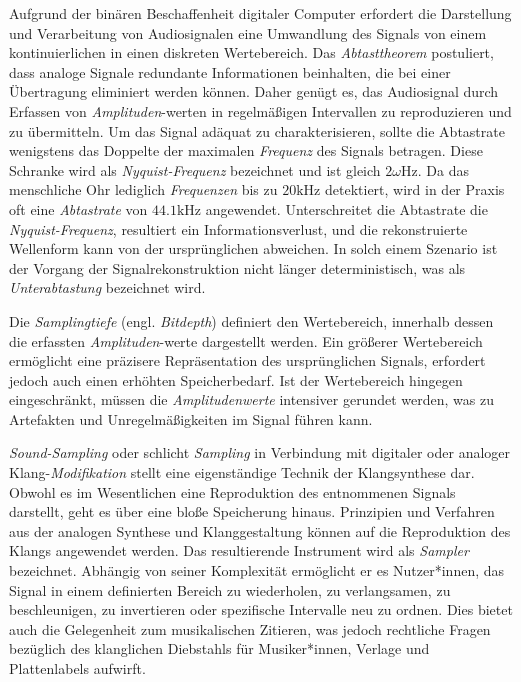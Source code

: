 \documentclass[
  a4paper,  %
  twoside,  %
  bibliography=totoc,
  headsepline,
  cleardoublepage=empty,
  parskip=half,
  draft=false
]{scrbook}
\begin{document}
Aufgrund der binären Beschaffenheit digitaler Computer erfordert die Darstellung und Verarbeitung von Audiosignalen eine Umwandlung des Signals von einem kontinuierlichen in einen diskreten Wertebereich. Das \emph{Abtasttheorem} postuliert, dass analoge Signale redundante Informationen beinhalten, die bei einer Übertragung eliminiert werden können. Daher genügt es, das Audiosignal durch Erfassen von \emph{Amplituden}-werten in regelmäßigen Intervallen zu reproduzieren und zu übermitteln. Um das Signal adäquat zu charakterisieren, sollte die Abtastrate wenigstens das Doppelte der maximalen \emph{Frequenz} des Signals betragen. Diese Schranke wird als \emph{Nyquist-Frequenz} bezeichnet und ist gleich $2 \omega \mathrm{Hz}$. Da das menschliche Ohr lediglich \emph{Frequenzen} bis zu $20 \text{kHz}$ detektiert, wird in der Praxis oft eine \emph{Abtastrate} von $44.1\text{kHz}$ angewendet. Unterschreitet die Abtastrate die \emph{Nyquist-Frequenz}, resultiert ein Informationsverlust, und die rekonstruierte Wellenform kann von der ursprünglichen abweichen. In solch einem Szenario ist der Vorgang der Signalrekonstruktion nicht länger deterministisch, was als \emph{Unterabtastung} bezeichnet wird. \cite{lai_practical_2004, shannon_communication_1949, ruschkowski_elektronische_2019}

Die \emph{Samplingtiefe} (engl. \emph{Bitdepth}) definiert den Wertebereich, innerhalb dessen die erfassten \emph{Amplituden}-werte dargestellt werden. Ein größerer Wertebereich ermöglicht eine präzisere Repräsentation des ursprünglichen Signals, erfordert jedoch auch einen erhöhten Speicherbedarf. Ist der Wertebereich hingegen eingeschränkt, müssen die \emph{Amplitudenwerte} intensiver gerundet werden, was zu Artefakten und Unregelmäßigkeiten im Signal führen kann. \cite{thompson_understanding_2005}

\emph{Sound-Sampling} oder schlicht \emph{Sampling} in Verbindung mit digitaler oder analoger Klang-\emph{Modifikation} stellt eine eigenständige Technik der Klangsynthese dar. Obwohl es im Wesentlichen eine Reproduktion des entnommenen Signals darstellt, geht es über eine bloße Speicherung hinaus. Prinzipien und Verfahren aus der analogen Synthese und Klanggestaltung können auf die Reproduktion des Klangs angewendet werden. Das resultierende Instrument wird als \emph{Sampler} bezeichnet. Abhängig von seiner Komplexität ermöglicht er es Nutzer*innen, das Signal in einem definierten Bereich zu wiederholen, zu verlangsamen, zu beschleunigen, zu invertieren oder spezifische Intervalle neu zu ordnen. Dies bietet auch die Gelegenheit zum musikalischen Zitieren, was jedoch rechtliche Fragen bezüglich des klanglichen Diebstahls für Musiker*innen, Verlage und Plattenlabels aufwirft. \cite{russ_sound_2009, ruschkowski_elektronische_2019, katz_capturing_2010}
\end{document}
